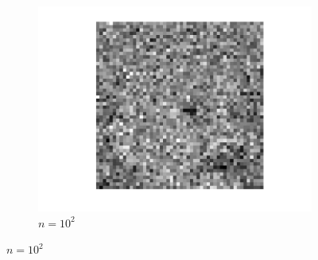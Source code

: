 \documentclass[english,11pt]{article}
\numberwithin{equation}{section}
\theoremstyle{plain}
\theoremstyle{definition}
\theoremstyle{remark}
\theoremstyle{plain}
\theoremstyle{remark}
\theoremstyle{plain}
\theoremstyle{plain}
\begin{document}
\begin{figure}[h!]
\begin{subfigure}[h]{0.3\textwidth}
		\includegraphics[scale=0.3]{Einstein_from_noise_n100}
		\caption{$n = 10^2$}
	\end{subfigure}


\end{figure}
\end{document}
